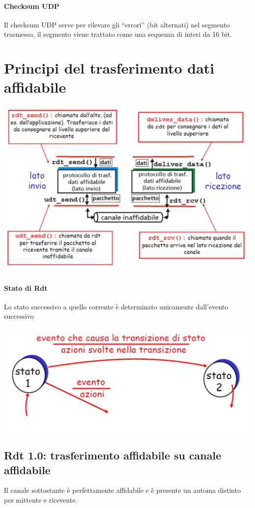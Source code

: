 \documentclass{report}
\begin{document}
	\paragraph{Checksum UDP} Il checksum UDP serve per rilevare gli “errori” (bit alternati) nel segmento trasmesso, il segmento viene trattato come una sequenza di interi da 16 bit.

	\section{Principi del trasferimento dati affidabile}
	\begin{center}
		\includegraphics[width=0.7\linewidth]{rdt-1}
	\end{center}
	\paragraph{Stato di Rdt} Lo stato successivo a quello corrente è determinato unicamente dall'evento successivo
	\begin{center}
		\includegraphics[width=0.7\linewidth]{rdt-stato}
	\end{center}
	\subsection{Rdt 1.0: trasferimento affidabile su canale affidabile}
	Il canale sottostante è perfettamente affidabile e è presente un automa distinto per mittente e ricevente.
\end{document}
